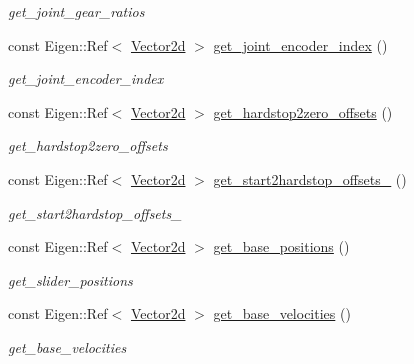 \begin{DoxyCompactItemize}
\begin{DoxyCompactList}\small\item\em get\+\_\+joint\+\_\+gear\+\_\+ratios \end{DoxyCompactList}\item 
const Eigen\+::\+Ref$<$ \hyperlink{common__header_8hpp_acb6916bc8c9fe9d98c484fd4cc201447}{Vector2d} $>$ \hyperlink{classblmc__robots_1_1Stuggihop_afc0dfd7c91f9a83126ed6644ae29ed20}{get\+\_\+joint\+\_\+encoder\+\_\+index} ()
\begin{DoxyCompactList}\small\item\em get\+\_\+joint\+\_\+encoder\+\_\+index \end{DoxyCompactList}\item 
const Eigen\+::\+Ref$<$ \hyperlink{common__header_8hpp_acb6916bc8c9fe9d98c484fd4cc201447}{Vector2d} $>$ \hyperlink{classblmc__robots_1_1Stuggihop_a0669e1c16bd6698966149cebad9c43fc}{get\+\_\+hardstop2zero\+\_\+offsets} ()
\begin{DoxyCompactList}\small\item\em get\+\_\+hardstop2zero\+\_\+offsets \end{DoxyCompactList}\item 
const Eigen\+::\+Ref$<$ \hyperlink{common__header_8hpp_acb6916bc8c9fe9d98c484fd4cc201447}{Vector2d} $>$ \hyperlink{classblmc__robots_1_1Stuggihop_a206157411d7bd41d5d599106512482ae}{get\+\_\+start2hardstop\+\_\+offsets\+\_\+} ()
\begin{DoxyCompactList}\small\item\em get\+\_\+start2hardstop\+\_\+offsets\+\_\+ \end{DoxyCompactList}\item 
const Eigen\+::\+Ref$<$ \hyperlink{common__header_8hpp_acb6916bc8c9fe9d98c484fd4cc201447}{Vector2d} $>$ \hyperlink{classblmc__robots_1_1Stuggihop_a6da73065d935420daf4959b8f912128c}{get\+\_\+base\+\_\+positions} ()
\begin{DoxyCompactList}\small\item\em get\+\_\+slider\+\_\+positions \end{DoxyCompactList}\item 
const Eigen\+::\+Ref$<$ \hyperlink{common__header_8hpp_acb6916bc8c9fe9d98c484fd4cc201447}{Vector2d} $>$ \hyperlink{classblmc__robots_1_1Stuggihop_a7f869117918d0d5d5813d29222430d88}{get\+\_\+base\+\_\+velocities} ()
\begin{DoxyCompactList}\small\item\em get\+\_\+base\+\_\+velocities \end{DoxyCompactList}\item 

\end{DoxyCompactItemize}
